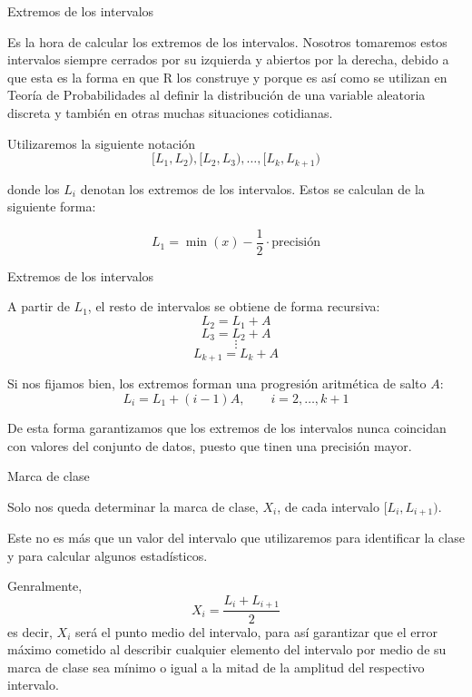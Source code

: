 \documentclass[
  ignorenonframetext,
]{beamer}
\begin{document}
\begin{frame}{Extremos de los intervalos}
\protect\hypertarget{extremos-de-los-intervalos}{}

Es la hora de calcular los extremos de los intervalos. Nosotros
tomaremos estos intervalos siempre cerrados por su izquierda y abiertos
por la derecha, debido a que esta es la forma en que R los construye y
porque es así como se utilizan en Teoría de Probabilidades al definir la
distribución de una variable aleatoria discreta y también en otras
muchas situaciones cotidianas.

Utilizaremos la siguiente notación
\[[L_1,L_2),[L_2,L_3),\dots,[L_k,L_{k+1})\]

donde los \(L_i\) denotan los extremos de los intervalos. Estos se
calculan de la siguiente forma:

\[L_1 = \min(x)-\frac{1}{2}\cdot \text{precisión}\]

\end{frame}

\begin{frame}{Extremos de los intervalos}
\protect\hypertarget{extremos-de-los-intervalos-1}{}

A partir de \(L_1\), el resto de intervalos se obtiene de forma
recursiva: \[L_2 = L_1 + A\] \[L_3 = L_2 + A\] \[\vdots\]
\[L_{k+1} = L_k+A\]

Si nos fijamos bien, los extremos forman una progresión aritmética de
salto \(A\): \[L_{i} = L_{1}+(i-1)A,\qquad i=2,\dots,k+1\]

De esta forma garantizamos que los extremos de los intervalos nunca
coincidan con valores del conjunto de datos, puesto que tinen una
precisión mayor.

\end{frame}

\begin{frame}{Marca de clase}
\protect\hypertarget{marca-de-clase}{}

Solo nos queda determinar la marca de clase, \(X_i\), de cada intervalo
\([L_i,L_{i+1})\).

Este no es más que un valor del intervalo que utilizaremos para
identificar la clase y para calcular algunos estadísticos.

Genralmente, \[X_i = \frac{L_i+L_{i+1}}{2}\] es decir, \(X_i\) será el
punto medio del intervalo, para así garantizar que el error máximo
cometido al describir cualquier elemento del intervalo por medio de su
marca de clase sea mínimo o igual a la mitad de la amplitud del
respectivo intervalo.

\end{frame}
\end{document}
